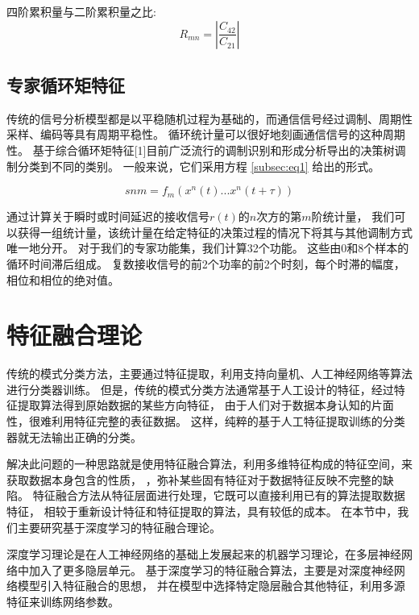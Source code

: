 四阶累积量与二阶累积量之比:
\begin{equation}
R_{mn} = |\frac{C_{42}}{C_{21}}|
\end{equation}
 

\subsection{专家循环矩特征}

传统的信号分析模型都是以平稳随机过程为基础的，而通信信号经过调制、周期性采样、编码等具有周期平稳性。
循环统计量可以很好地刻画通信信号的这种周期性。
基于综合循环矩特征[1]目前广泛流行的调制识别和形成分析导出的决策树调制分类到不同的类别。 
一般来说，它们采用方程 \ref{subsec:eq1} 给出的形式。

\begin{equation}
\label{subsec:eq1}
snm = f_{m}(x^{n}(t)...x^{n}(t + \tau))
\end{equation}

通过计算关于瞬时或时间延迟的接收信号$r(t)$的$n$次方的第$m$阶统计量，
我们可以获得一组统计量，该统计量在给定特征的决策过程的情况下将其与其他调制方式唯一地分开。 
对于我们的专家功能集，我们计算32个功能。 这些由0和8个样本的循环时间滞后组成。 
复数接收信号的前2个功率的前2个时刻，每个时滞的幅度，相位和相位的绝对值。\par


\section{特征融合理论}
传统的模式分类方法，主要通过特征提取，利用支持向量机、人工神经网络等算法进行分类器训练。 
但是，传统的模式分类方法通常基于人工设计的特征，经过特征提取算法得到原始数据的某些方向特征，
由于人们对于数据本身认知的片面性，很难利用特征完整的表征数据。
这样，纯粹的基于人工特征提取训练的分类器就无法输出正确的分类。\par

解决此问题的一种思路就是使用特征融合算法，利用多维特征构成的特征空间，来获取数据本身包含的性质，
，弥补某些固有特征对于数据特征反映不完整的缺陷。
特征融合方法从特征层面进行处理，它既可以直接利用已有的算法提取数据特征，
相较于重新设计特征和特征提取的算法，具有较低的成本。
在本节中，我们主要研究基于深度学习的特征融合理论。\par

深度学习理论是在人工神经网络的基础上发展起来的机器学习理论，在多层神经网络中加入了更多隐层单元。
基于深度学习的特征融合算法，主要是对深度神经网络模型引入特征融合的思想，
并在模型中选择特定隐层融合其他特征，利用多源特征来训练网络参数。\par

